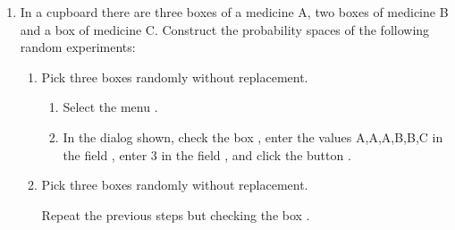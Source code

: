\begin{enumerate}[leftmargin=*]
\item In a cupboard there are three boxes of a medicine A, two boxes of medicine B and a box of medicine C. 
Construct the probability spaces of the following random experiments:
\begin{enumerate}
\item Pick three boxes randomly without replacement. 
\begin{indication}
\begin{enumerate}
\item Select the menu .
\item In the dialog shown, check the box , enter the values A,A,A,B,B,C in the field , enter 3 in the field , and click the button .
\end{enumerate}
\end{indication}

\item Pick three boxes randomly without replacement. 
\begin{indication}
Repeat the previous steps but checking the box .
\end{indication}
\end{enumerate}


\end{enumerate}
